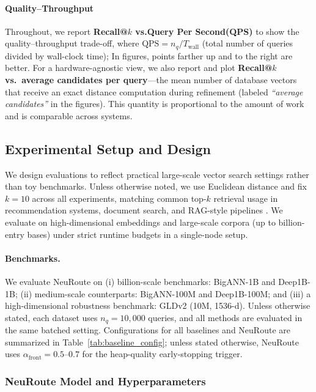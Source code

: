 \documentclass[sigconf, nonacm]{acmart}
\begin{document}
\paragraph{Quality–Throughput}
Throughout, we report \textbf{Recall@\(k\) vs.Query Per Second(QPS)} \cite{ref40} to show the quality–throughput trade-off, where
\(\mathrm{QPS} = n_q / T_{\text{wall}}\) (total number of queries divided by wall-clock time); In figures,
points farther up and to the right are better. For a hardware-agnostic view, we also report and plot
\textbf{Recall@\(k\) vs.\ average candidates per query}—the mean number of database vectors
that receive an exact distance computation during refinement (labeled \emph{“average candidates”}
in the figures). This quantity is proportional to the amount of work and is comparable across systems.


\subsection{Experimental Setup and Design}
\label{experiment_design}

We design evaluations to reflect practical large-scale vector search settings rather than toy benchmarks. Unless otherwise noted, we use Euclidean distance and fix $k{=}10$ across all experiments, matching common top-$k$ retrieval usage in recommendation systems, document search, and RAG-style pipelines \cite{rajput2023recommendersystemsgenerativeretrieval,wang2018billionscalecommodityembeddingecommerce,10.1145/3448016.3457550,ref3,ref28}. We evaluate on high-dimensional embeddings and large-scale corpora (up to billion-entry bases) under strict runtime budgets in a single-node setup.

\paragraph{Benchmarks.}
We evaluate NeuRoute on (i) billion-scale benchmarks: BigANN-1B and Deep1B-1B; (ii) medium-scale counterparts: BigANN-100M and Deep1B-100M; and (iii) a high-dimensional robustness benchmark: GLDv2 (10M, 1536-d). Unless otherwise stated, each dataset uses $n_q=10{,}000$ queries, and all methods are evaluated in the same batched setting. Configurations for all baselines and NeuRoute are summarized in Table~\ref{tab:baseline_config}; unless stated otherwise, NeuRoute uses $\alpha_{\mathrm{front}}=0.5\text{--}0.7$ for the heap-quality early-stopping trigger.


\subsubsection{NeuRoute Model and Hyperparameters}
\label{sec:neuroute_model_hparams}
\end{document}

